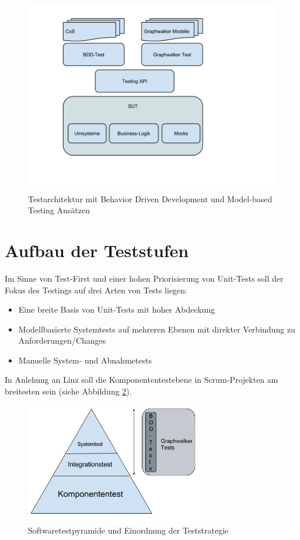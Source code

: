 \begin{figure}[h] 
  \centering
     \includegraphics[width=1.0\textwidth]{figures/Testarchitektur-MBT-BDD-COS.png}
  \caption{Testarchitektur mit Behavior Driven Development und Model-based Testing Ansätzen}
  \label{fig:testarchitektur}
\end{figure}

\section{Aufbau der Teststufen}
Im Sinne von \Gls{Test-First} und einer hohen Priorisierung von Unit-Tests soll der Fokus des Testings auf drei Arten von Tests liegen:

\begin{itemize}
\item Eine breite Basis von Unit-Tests mit hoher Abdeckung
\item Modellbasierte Systemtests auf mehreren Ebenen mit direkter Verbindung zu Anforderungen/Changes
\item Manuelle System- und Abnahmetests
\end{itemize}

In Anlehung an Linz \cite{linz_testing_2014} soll die Komponententestebene in Scrum-Projekten am breitesten sein (siehe Abbildung \ref{fig:pyramide}).

\begin{figure}[h] 
  \centering
     \includegraphics[width=0.7\textwidth]{figures/pyramide_mbt_bdd.png}
  \caption{Softwaretestpyramide und Einordnung der Teststrategie}
  \label{fig:pyramide}
\end{figure}

